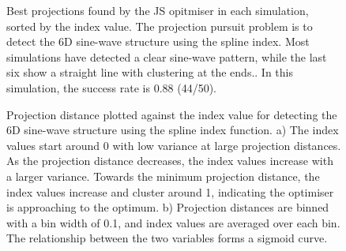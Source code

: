 \documentclass[
  number,
  preprint,
  3p]{elsarticle}
\begin{document}
\begin{figure}


\caption{\label{fig-projection}Best projections found by the JS
opitmiser in each simulation, sorted by the index value. The projection
pursuit problem is to detect the 6D sine-wave structure using the spline
index. Most simulations have detected a clear sine-wave pattern, while
the last six show a straight line with clustering at the ends.. In this
simulation, the success rate is 0.88 (44/50).}

\end{figure}%

\begin{figure}


\caption{\label{fig-index-value-proj-dist}Projection distance plotted
against the index value for detecting the 6D sine-wave structure using
the spline index function. a) The index values start around 0 with low
variance at large projection distances. As the projection distance
decreases, the index values increase with a larger variance. Towards the
minimum projection distance, the index values increase and cluster
around 1, indicating the optimiser is approaching to the optimum. b)
Projection distances are binned with a bin width of 0.1, and index
values are averaged over each bin. The relationship between the two
variables forms a sigmoid curve.}

\end{figure}%
\end{document}
